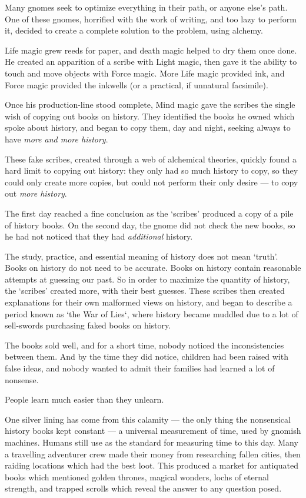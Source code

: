\begin{exampletext}
    Many gnomes seek to optimize everything in their path, or anyone else's path.
    One of these gnomes, horrified with the work of writing, and too lazy to perform it, decided to create a complete solution to the problem, using alchemy.

    Life magic grew reeds for paper, and death magic helped to dry them once done.
    He created an apparition of a scribe with Light magic, then gave it the ability to touch and move objects with Force magic.
    More Life magic provided ink, and Force magic provided the inkwells (or a practical, if unnatural facsimile).

    Once his production-line stood complete, Mind magic gave the scribes the single wish of copying out books on history.
    They identified the books he owned which spoke about history, and began to copy them, day and night, seeking always to have \emph{more and more history}.

    These fake scribes, created through a web of alchemical theories, quickly found a hard limit to copying out history: they only had so much history to copy, so they could only create more copies, but could not perform their only desire --- to copy out \emph{more history}.

    The first day reached a fine conclusion as the `scribes' produced a copy of a pile of history books.
    On the second day, the gnome did not check the new books, so he had not noticed that they had \emph{additional} history.

    The study, practice, and essential meaning of history does not mean `truth'.
    Books on history do not need to be accurate.
    Books on history contain reasonable attempts at guessing our past.
    So in order to maximize the quantity of history, the `scribes' created more, with their best guesses.
    These scribes then created explanations for their own malformed views on history, and began to describe a period known as `the War of Lies`, where history became muddled due to a lot of sell-swords purchasing faked books on history.

    The books sold well, and for a short time, nobody noticed the inconsistencies between them.
    And by the time they did notice, children had been raised with false ideas, and nobody wanted to admit their families had learned a lot of nonsense.

    People learn much easier than they unlearn.

    One silver lining has come from this calamity --- the only thing the nonsensical history books kept constant --- a universal measurement of time, used by gnomish machines.
    Humans still use  as the standard for measuring time to this day.
  \or
    Many a travelling adventurer crew made their money from researching fallen cities, then raiding locations which had the best loot.
    This produced a market for antiquated books which mentioned golden thrones, magical wonders, lochs of eternal strength, and trapped scrolls which reveal the answer to any question posed.


\end{exampletext}
